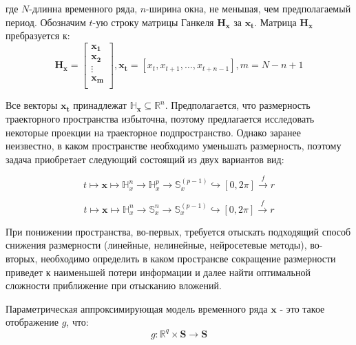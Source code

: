 \documentclass[12pt,twoside]{article}
\begin{document}
                   
где $N$-длинна временного ряда, $n$-ширина окна, не меньшая, чем предполагаемый период. Обозначим $t$-ую строку матрицы Ганкеля $\mathbf{H_{x}}$ за $\mathbf{x_{t}}$. Матрица $\mathbf{H_{x}}$ пребразуется к:	
\begin{equation}
	\mathbf{H_{x}} = 
	\begin{bmatrix} 
                  	\mathbf{x_{1}}\\ \mathbf{x_{2}}\\
                  	\vdots\\
                  	\mathbf{x_{m}}\\
                   \end{bmatrix},
                   \mathbf{x_t}=[x_{t},x_{t+1},\ldots,x_{t+n-1}] ,
                   m = N-n+1
\label{eq:hankel_matrix_2}
\end{equation}
\vspace{\baselineskip}

Все векторы $\mathbf{x_{t}}$ принадлежат $\mathbb{H}_{\mathbf{x}} \subseteq \mathbb{R}^{n}$. Предполагается, что размерность траекторного пространства избыточна, поэтому предлагается исследовать некоторые проекции на траекторное подпространство.
Однако заранее неизвестно, в каком пространстве необходимо уменьшать размерность, поэтому задача приобретает следующий состоящий из двух вариантов вид:

\begin{equation}
	t \mapsto \mathbf{x} \mapsto \mathbb{H}_{x}^{n} \xrightarrow{} \mathbb{H}_{x}^{p} \xrightarrow{} \mathbb{S}_x^{(p-1)} \hookrightarrow [0,2\pi] \xrightarrow{f} r
\label{eq:goal}
\end{equation}

\begin{equation}
	t \mapsto \mathbf{x} \mapsto \mathbb{H}_{x}^{n} \xrightarrow{} \mathbb{S}_{x}^{n} \xrightarrow{} \mathbb{S}_x^{(p-1)} \hookrightarrow [0,2\pi] \xrightarrow{f} r
\label{eq:goal_2}
\end{equation}

При понижении пространства, во-первых, требуется отыскать подходящий способ снижения размерности (линейные, нелинейные, нейросетевые методы), во-вторых, необходимо определить в каком пространсве сокращение размерности приведет к наименьшей потери информации и далее найти оптимальной сложности приближение при отысканию вложений. 
\vspace{\baselineskip}

\begin{Def}
Параметрическая аппроксимирующая модель временного ряда  $\mathbf{x}$  - это такое отображение $g$, что:
\begin{equation} g: \mathbb{R}^{q} \times \mathbf{S} \xrightarrow{} \mathbf{S}
\label{eq:param_model}
\end{equation}
\end{Def}
\end{document}
